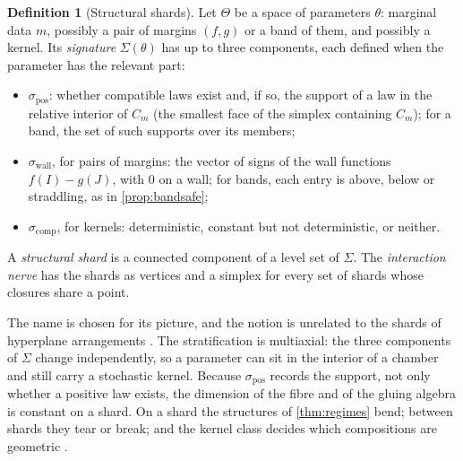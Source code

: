 \documentclass[11pt]{article}
\theoremstyle{definition}
\newtheorem{definition}[theorem]{Definition}
\theoremstyle{remark}
\begin{document}
\begin{definition}[Structural shards]\label{def:shards}
Let $\Theta$ be a space of parameters $\theta$: marginal data $m$, possibly a pair of margins $(f,g)$ or a band of them, and
possibly a kernel. Its \emph{signature} $\Sigma(\theta)$ has up to three components, each defined when the parameter has the relevant part:
\begin{itemize}[leftmargin=*,nosep]
\item $\sigma_{\mathrm{pos}}$: whether compatible laws exist and, if so, the support of a law in the relative interior of $C_m$ (the
  smallest face of the simplex containing $C_m$); for a band, the set of such supports over its members;
\item $\sigma_{\mathrm{wall}}$, for pairs of margins: the vector of signs of the wall functions $f(I)-g(J)$, with $0$ on a wall; for bands,
  each entry is above, below or straddling, as in \cref{prop:bandsafe};
\item $\sigma_{\mathrm{comp}}$, for kernels: deterministic, constant but not deterministic, or neither.
\end{itemize} A \emph{structural shard}
is a connected component of a level set of $\Sigma$. The \emph{interaction nerve} has the shards as vertices and a simplex for every set
of shards whose closures share a point.
\end{definition}

The name is chosen for its picture, and the notion is unrelated to the shards of hyperplane arrangements \cite{Reading2011}. The
stratification is multiaxial: the three components of $\Sigma$ change independently, so a parameter can sit in the interior of a chamber
and still carry a stochastic kernel. Because $\sigma_{\mathrm{pos}}$ records the support, not only whether a positive law exists, the
dimension of the fibre and of the gluing algebra is constant on a shard. On a shard the structures of \cref{thm:regimes} bend; between shards they tear or break; and
the kernel class decides which compositions are geometric \cite[Thm.~5.1]{Bridges}.
\end{document}
